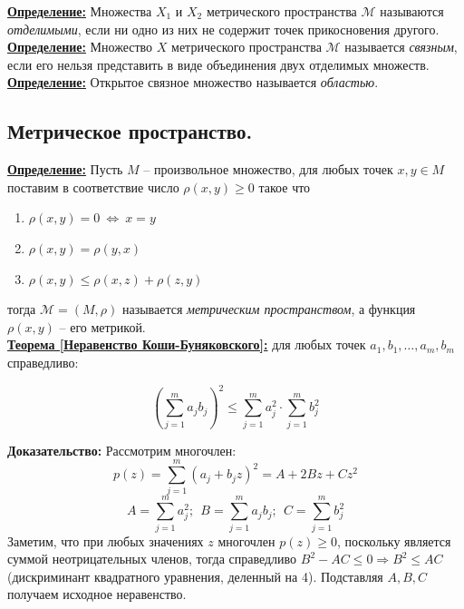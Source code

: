 \documentclass[a4paper,12pt]{article} %
\begin{document}
\underline{\textbf{Определение:}} Множества $X_1$ и $X_2$ метрического пространства $\mathscr{M}$ называются \textit{отделимыми}, если ни одно из них не содержит точек прикосновения другого.\\

\underline{\textbf{Определение:}} Множество $X$ метрического пространства $\mathscr{M}$ называется \textit{связным}, если его нельзя представить в виде объединения двух отделимых множеств.\\

\underline{\textbf{Определение:}} Открытое связное множество называется \textit{областью}.\\

\subsection{Метрическое пространство.}

\underline{\textbf{Определение:}} Пусть $M$ -- произвольное множество, для любых точек $x, y \in M$ поставим в соответствие число $\rho(x, y) \geqslant 0$ такое что
\begin{enumerate}
    \item $\rho(x, y) = 0 ~ \Leftrightarrow ~ x = y$
    \item $\rho(x, y) = \rho(y, x)$
    \item $\rho(x, y) \leqslant \rho(x, z) + \rho(z, y)$
\end{enumerate}
\noindent тогда $\mathscr{M} = (M, \rho)$ называется \textit{метрическим пространством}, а функция $\rho(x, y)$ -- его метрикой.\\

\underline{\textbf{Теорема [Неравенство Коши-Буняковского]:}} для любых точек $a_1, b_1, \dots, a_m, b_m$ справедливо:

\begin{equation*}
    \left( \sum\limits_{j = 1}^{m} a_j b_j \right)^2 \leqslant \sum\limits_{j = 1}^{m} a_j^2 \cdot \sum\limits_{j = 1}^{m} b_j^2
\end{equation*}

\textbf{Доказательство:} Рассмотрим многочлен:
\[ p(z) = \sum\limits_{j = 1}^{m} (a_j + b_j z)^2 = A + 2Bz + Cz^2 \]
\[ A = \sum\limits_{j = 1}^{m} a_j^2; ~~ B = \sum\limits_{j = 1}^{m} a_j b_j; ~~ C = \sum\limits_{j = 1}^{m} b_j^2 \]
Заметим, что при любых значениях $z$ многочлен $p(z) \geqslant 0$, поскольку является суммой неотрицательных членов, тогда справедливо $B^2 - AC \leqslant 0 \Rightarrow B^2 \leqslant AC$ (дискриминант квадратного уравнения, деленный на 4). Подставляя $A, B, C$ получаем исходное неравенство.\\
\end{document}
